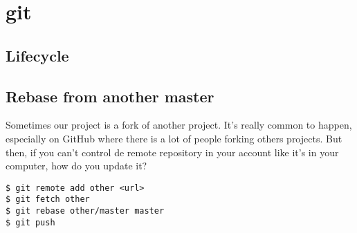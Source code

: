 \section{git}
\subsection{Lifecycle}

\subsection{Rebase from another master}
Sometimes our project is a fork of another project. It's really common to happen, especially on GitHub where there is a lot of people forking others projects.\newline
But then, if you can't control de remote repository in your account like it's in your computer, how do you update it?
\begin{lstlisting}
$ git remote add other <url>
$ git fetch other
$ git rebase other/master master
$ git push
\end{lstlisting}
